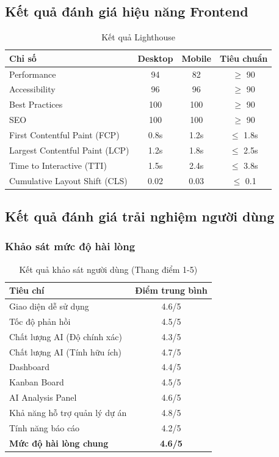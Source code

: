 \documentclass[12pt,a4paper]{report}
\begin{document}
\subsection{Kết quả đánh giá hiệu năng Frontend}

\begin{table}[H]
\centering
\caption{Kết quả Lighthouse}
\begin{tabular}{|p{5cm}|c|c|c|}
\hline
\textbf{Chỉ số} & \textbf{Desktop} & \textbf{Mobile} & \textbf{Tiêu chuẩn} \\
\hline
Performance & 94 & 82 & $\ge$ 90 \\
\hline
Accessibility & 96 & 96 & $\ge$ 90 \\
\hline
Best Practices & 100 & 100 & $\ge$ 90 \\
\hline
SEO & 100 & 100 & $\ge$ 90 \\
\hline
First Contentful Paint (FCP) & 0.8s & 1.2s & $\le$ 1.8s \\
\hline
Largest Contentful Paint (LCP) & 1.2s & 1.8s & $\le$ 2.5s \\
\hline
Time to Interactive (TTI) & 1.5s & 2.4s & $\le$ 3.8s \\
\hline
Cumulative Layout Shift (CLS) & 0.02 & 0.03 & $\le$ 0.1 \\
\hline
\end{tabular}
\label{tab:lighthouse_results}
\end{table}

\subsection{Kết quả đánh giá trải nghiệm người dùng}

\subsubsection{Khảo sát mức độ hài lòng}

\begin{table}[H]
\centering
\caption{Kết quả khảo sát người dùng (Thang điểm 1-5)}
\begin{tabular}{|p{7cm}|c|}
\hline
\textbf{Tiêu chí} & \textbf{Điểm trung bình} \\
\hline
Giao diện dễ sử dụng & 4.6/5 \\
\hline
Tốc độ phản hồi & 4.5/5 \\
\hline
Chất lượng AI (Độ chính xác) & 4.3/5 \\
\hline
Chất lượng AI (Tính hữu ích) & 4.7/5 \\
\hline
Dashboard & 4.4/5 \\
\hline
Kanban Board & 4.5/5 \\
\hline
AI Analysis Panel & 4.6/5 \\
\hline
Khả năng hỗ trợ quản lý dự án & 4.8/5 \\
\hline
Tính năng báo cáo & 4.2/5 \\
\hline
\textbf{Mức độ hài lòng chung} & \textbf{4.6/5} \\
\hline
\end{tabular}
\label{tab:user_survey_results}
\end{table}
\end{document}
